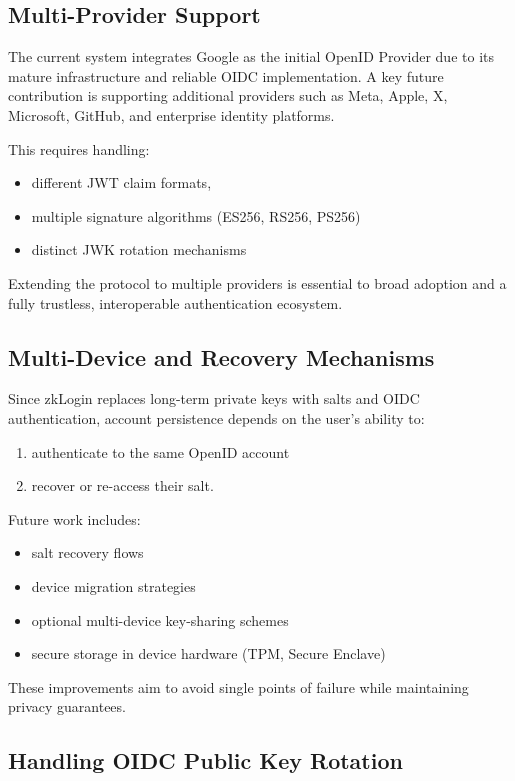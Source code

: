 \documentclass{article}
\begin{document}
\subsection{Multi-Provider Support}

The current system integrates Google as the initial OpenID Provider due to its mature infrastructure and reliable OIDC implementation. A key future contribution is supporting additional providers such as Meta, Apple, X, Microsoft, GitHub, and enterprise identity platforms.

This requires handling:
\begin{itemize}
    \item different JWT claim formats,
    \item multiple signature algorithms (ES256, RS256, PS256)
    \item distinct JWK rotation mechanisms
\end{itemize}

Extending the protocol to multiple providers is essential to broad adoption and a fully trustless, interoperable authentication ecosystem.

\subsection{Multi-Device and Recovery Mechanisms}

Since zkLogin replaces long-term private keys with salts and OIDC authentication, account persistence depends on the user's ability to:
\begin{enumerate}
    \item authenticate to the same OpenID account
    \item recover or re-access their salt.
\end{enumerate}

Future work includes:
\begin{itemize}
    \item salt recovery flows
    \item device migration strategies
    \item optional multi-device key-sharing schemes
    \item secure storage in device hardware (TPM, Secure Enclave)
\end{itemize}

These improvements aim to avoid single points of failure while maintaining privacy guarantees.

\subsection{Handling OIDC Public Key Rotation}
\end{document}
